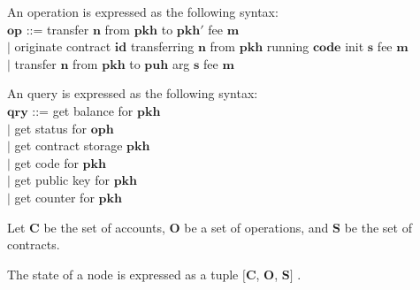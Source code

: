 \documentclass[a4paper]{llncs}
\begin{document}
\begin{definition}[Operation]
An operation is expressed as the following syntax:
\\
$\mathbf{op}$ ::= transfer  $\mathbf{n}$ from $\mathbf{pkh}$ to $\mathbf{pkh'}$ fee $\mathbf{m}$
\\$\mid$ originate contract $\mathbf{id}$ transferring  $\mathbf{n}$ from $\mathbf{pkh}$ running $\mathbf{code}$ init $\mathbf{s}$ fee $\mathbf{m}$
\\$\mid$ transfer $\mathbf{n}$ from $\mathbf{pkh}$ to  $\mathbf{puh}$ arg $\mathbf{s}$ fee $\mathbf{m}$
\end{definition}

\begin{definition}[Query]
An query is expressed as the following syntax:
\\
$\mathbf{qry}$ ::= get balance for $\mathbf{pkh}$
\\$\mid$ get status for $\mathbf{oph}$ 
\\$\mid$ get contract storage $\mathbf{pkh}$ 
\\$\mid$ get code for $\mathbf{pkh}$ 
\\$\mid$ get public key for $\mathbf{pkh}$
\\$\mid$ get counter for $\mathbf{pkh}$

\end{definition}
Let $\mathbf{C}$ be the set of accounts,   $\mathbf{O}$ be a set of operations, and $\mathbf{S}$ be the set of contracts. 
 \begin{definition}
The state of a node is expressed as a tuple $[$$\mathbf{C}$, $\mathbf{O}$, $\mathbf{S}$$]$ .
\end{definition}
\end{document}
